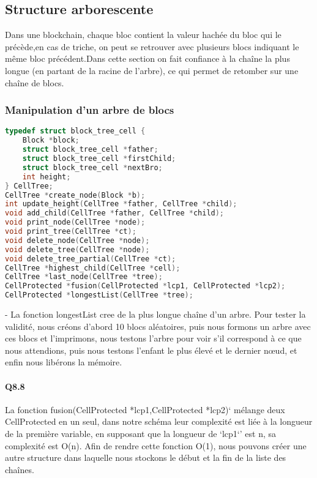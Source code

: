 \documentclass{article}
\begin{document}
\subsection{Structure arborescente}
Dans une blockchain, chaque bloc contient la valeur hachée du bloc qui le précède,en cas de triche, on peut se retrouver avec plusieurs blocs indiquant le même bloc précédent.Dans cette section on fait confiance à la chaîne la plus longue (en partant de la racine de l’arbre), ce qui permet de retomber sur une chaîne de blocs.
\subsubsection{Manipulation d'un arbre de blocs}
\begin{lstlisting}[language={C}]
typedef struct block_tree_cell {
    Block *block;
    struct block_tree_cell *father;
    struct block_tree_cell *firstChild;
    struct block_tree_cell *nextBro;
    int height;
} CellTree;
CellTree *create_node(Block *b);
int update_height(CellTree *father, CellTree *child);
void add_child(CellTree *father, CellTree *child);
void print_node(CellTree *node);
void print_tree(CellTree *ct);
void delete_node(CellTree *node);
void delete_tree(CellTree *node);
void delete_tree_partial(CellTree *ct);
CellTree *highest_child(CellTree *cell);
CellTree *last_node(CellTree *tree);
CellProtected *fusion(CellProtected *lcp1, CellProtected *lcp2);
CellProtected *longestList(CellTree *tree);
\end{lstlisting}
- La fonction longestList cree de la plus longue chaîne d'un arbre.\newline\newline
Pour tester la validité, nous créons d'abord 10 blocs aléatoires, puis nous formons un arbre avec ces blocs et l'imprimons, nous testons l'arbre pour voir s'il correspond à ce que nous attendions, puis nous testons l'enfant le plus élevé et le dernier nœud, et enfin nous libérons la mémoire.
\paragraph*{Q8.8}
La fonction fusion(CellProtected *lcp1,CellProtected *lcp2)` mélange deux CellProtected en un seul, dans notre schéma leur complexité est liée à la longueur de la première variable, en supposant que la longueur de `lcp1`' est n, sa complexité est O(n).\newline
Afin de rendre cette fonction O(1), nous pouvons créer une autre structure dans laquelle nous stockons le début et la fin de la liste des chaînes.
\end{document}
